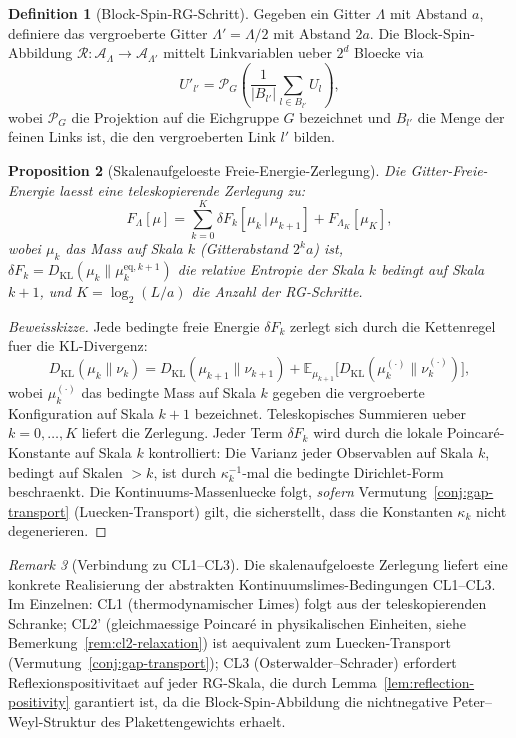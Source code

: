 \documentclass[12pt,a4paper]{article}
\theoremstyle{definition}
\newtheorem{definition}{Definition}[section]
\theoremstyle{plain}
\newtheorem{proposition}[definition]{Proposition}
\theoremstyle{remark}
\newtheorem{remark}[definition]{Remark}
\begin{document}
\begin{definition}[Block-Spin-RG-Schritt]
\label{def:block-rg}
Gegeben ein Gitter $\Lambda$ mit Abstand $a$, definiere das vergroeberte Gitter $\Lambda' = \Lambda / 2$ mit Abstand $2a$. Die Block-Spin-Abbildung $\mathcal{R}: \mathcal{A}_\Lambda \to \mathcal{A}_{\Lambda'}$ mittelt Linkvariablen ueber $2^d$ Bloecke via
\[
U'_{l'} = \mathcal{P}_G\!\left( \frac{1}{|B_{l'}|} \sum_{l \in B_{l'}} U_l \right),
\]
wobei $\mathcal{P}_G$ die Projektion auf die Eichgruppe $G$ bezeichnet und $B_{l'}$ die Menge der feinen Links ist, die den vergroeberten Link $l'$ bilden.
\end{definition}

\begin{proposition}[Skalenaufgeloeste Freie-Energie-Zerlegung]
\label{prop:scale-resolved}
Die Gitter-Freie-Energie laesst eine teleskopierende Zerlegung zu:
\[
F_\Lambda[\mu] = \sum_{k=0}^{K} \delta F_k[\mu_k \,|\, \mu_{k+1}] + F_{\Lambda_K}[\mu_K],
\]
wobei $\mu_k$ das Mass auf Skala $k$ (Gitterabstand $2^k a$) ist, $\delta F_k = D_{\mathrm{KL}}(\mu_k \| \mu_k^{\mathrm{eq},k+1})$ die relative Entropie der Skala $k$ bedingt auf Skala $k+1$, und $K = \log_2(L/a)$ die Anzahl der RG-Schritte.
\end{proposition}

\begin{proof}[Beweisskizze]
Jede bedingte freie Energie $\delta F_k$ zerlegt sich durch die Kettenregel fuer die KL-Divergenz:
\[
D_{\mathrm{KL}}(\mu_k \| \nu_k) = D_{\mathrm{KL}}(\mu_{k+1} \| \nu_{k+1}) + \mathbb{E}_{\mu_{k+1}}\!\bigl[D_{\mathrm{KL}}(\mu_k^{(\cdot)} \| \nu_k^{(\cdot)})\bigr],
\]
wobei $\mu_k^{(\cdot)}$ das bedingte Mass auf Skala $k$ gegeben die vergroeberte Konfiguration auf Skala $k+1$ bezeichnet. Teleskopisches Summieren ueber $k = 0, \ldots, K$ liefert die Zerlegung. Jeder Term $\delta F_k$ wird durch die lokale Poincar\'e-Konstante auf Skala $k$ kontrolliert: Die Varianz jeder Observablen auf Skala $k$, bedingt auf Skalen $> k$, ist durch $\kappa_k^{-1}$-mal die bedingte Dirichlet-Form beschraenkt. Die Kontinuums-Massenluecke folgt, \emph{sofern} Vermutung~\ref{conj:gap-transport} (Luecken-Transport) gilt, die sicherstellt, dass die Konstanten $\kappa_k$ nicht degenerieren.
\end{proof}

\begin{remark}[Verbindung zu CL1--CL3]
\label{rem:hierarchical-cl}
Die skalenaufgeloeste Zerlegung liefert eine konkrete Realisierung der abstrakten Kontinuumslimes-Bedingungen CL1--CL3. Im Einzelnen: CL1 (thermodynamischer Limes) folgt aus der teleskopierenden Schranke; CL2' (gleichmaessige Poincar\'e in physikalischen Einheiten, siehe Bemerkung~\ref{rem:cl2-relaxation}) ist aequivalent zum Luecken-Transport (Vermutung~\ref{conj:gap-transport}); CL3 (Osterwalder--Schrader) erfordert Reflexionspositivitaet auf jeder RG-Skala, die durch Lemma~\ref{lem:reflection-positivity} garantiert ist, da die Block-Spin-Abbildung die nichtnegative Peter--Weyl-Struktur des Plakettengewichts erhaelt.
\end{remark}
\end{document}

